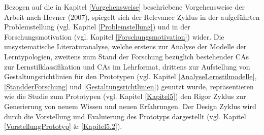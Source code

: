 Bezogen auf die in Kapitel \ref{Vorgehensweise} beschriebene Vorgehensweise der Arbeit nach Hevner (2007),
spiegelt sich der Relevance Zyklus in der aufgeführten Problemstellung (vgl. Kapitel \ref{Problemstellung})
und in der Forschungsmotivation (vgl. Kapitel \ref{Forschungsmotivation}) wider.
Die unsystematische Literaturanalyse, 
welche erstens zur Analyse der Modelle der Lerntypologien, zweitens zum Stand der Forschung bezüglich 
bestehender CAs zur Lernstilklassifikation und CAs im Lehrformat, drittens zur
Aufstellung von Gestaltungsrichtlinien 
für den Prototypen (vgl. Kapitel \ref{AnalyseLernstilmodelle}, \ref{StandderForschung} und \ref{Gestaltungsrichtlinien})
genutzt wurde, repräsentieren wie die Studie zum Prototypen (vgl. Kapitel \ref{Kapitel5}) den Rigor Zyklus zur Generierung von neuem Wissen und neuen Erfahrungen.
Der Design Zyklus wird durch die Vorstellung und Evaluierung des Prototyps dargestellt (vgl. Kapitel \ref{VorstellungPrototyp} \& \ref{Kapitel5.2}).
